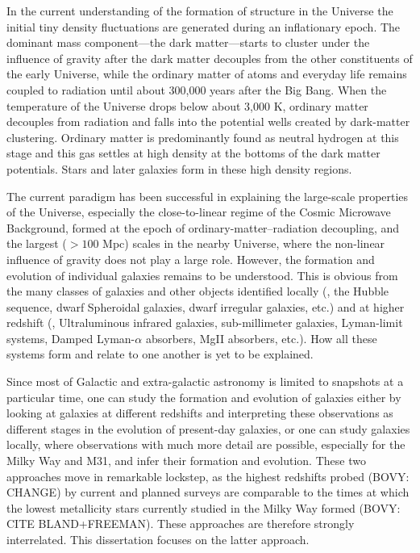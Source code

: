 In the current understanding of the formation of structure in the
Universe the initial tiny density fluctuations are generated during an
inflationary epoch. The dominant mass component---the dark
matter---starts to cluster under the influence of gravity after the
dark matter decouples from the other constituents of the early
Universe, while the ordinary matter of atoms and everyday life remains
coupled to radiation until about 300,000 years after the Big
Bang. When the temperature of the Universe drops below about 3,000 K,
ordinary matter decouples from radiation and falls into the potential
wells created by dark-matter clustering. Ordinary matter is
predominantly found as neutral hydrogen at this stage and this gas
settles at high density at the bottoms of the dark matter
potentials. Stars and later galaxies form in these high density regions.

The current paradigm has been successful in explaining the large-scale
properties of the Universe, especially the close-to-linear regime of
the Cosmic Microwave Background, formed at the epoch of
ordinary-matter--radiation decoupling, and the largest ($> 100$ Mpc)
scales in the nearby Universe, where the non-linear influence of
gravity does not play a large role. However, the formation and
evolution of individual galaxies remains to be understood. This is
obvious from the many classes of galaxies and other objects identified
locally (\eg, the Hubble sequence, dwarf Spheroidal galaxies, dwarf
irregular galaxies, etc.) and at higher redshift (\eg, Ultraluminous
infrared galaxies, sub-millimeter galaxies, Lyman-limit systems,
Damped Lyman-$\alpha$ absorbers, MgII absorbers, etc.). How all these
systems form and relate to one another is yet to be explained.

Since most of Galactic and extra-galactic astronomy is limited to
snapshots at a particular time, one can study the formation and
evolution of galaxies either by looking at galaxies at different
redshifts and interpreting these observations as different stages in
the evolution of present-day galaxies, or one can study galaxies
locally, where observations with much more detail are possible,
especially for the Milky Way and M31, and infer their formation and
evolution. These two approaches move in remarkable lockstep, as the
highest redshifts probed (BOVY: CHANGE) by current and planned surveys
are comparable to the times at which the lowest metallicity stars
currently studied in the Milky Way formed (BOVY: CITE
BLAND+FREEMAN). These approaches are therefore strongly
interrelated. This dissertation focuses on the latter approach.



